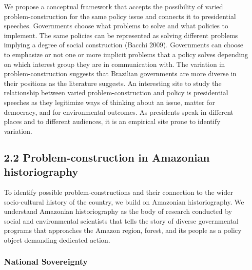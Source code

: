 \documentclass[
]{article}
\begin{document}
We propose a conceptual framework that accepts the possibility of varied
problem-construction for the same policy issue and connects it to
presidential speeches. Governments choose what problems to solve and
what policies to implement. The same policies can be represented as
solving different problems implying a degree of social construction
(Bacchi 2009). Governments can choose to emphasize or not one or more
implicit problems that a policy solves depending on which interest group
they are in communication with. The variation in problem-construction
suggests that Brazilian governments are more diverse in their positions
as the literature suggests. An interesting site to study the
relationship between varied problem-construction and policy is
presidential speeches as they legitimize ways of thinking about an
issue, matter for democracy, and for environmental outcomes. As
presidents speak in different places and to different audiences, it is
an empirical site prone to identify variation.

\hypertarget{problem-construction-in-amazonian-historiography}{%
\subsection{2.2 Problem-construction in Amazonian
historiography}\label{problem-construction-in-amazonian-historiography}}

To identify possible problem-constructions and their connection to the
wider socio-cultural history of the country, we build on Amazonian
historiography. We understand Amazonian historiography as the body of
research conducted by social and environmental scientists that tells the
story of diverse governmental programs that approaches the Amazon
region, forest, and its people as a policy object demanding dedicated
action.

\hypertarget{national-sovereignty}{%
\subsubsection{National Sovereignty}\label{national-sovereignty}}
\end{document}
